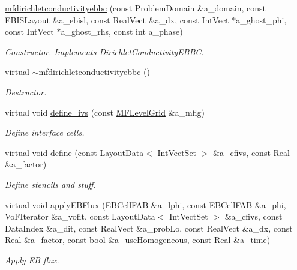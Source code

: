 \begin{DoxyCompactItemize}
\item 
\hyperlink{classmfdirichletconductivityebbc_a70c6f015454948e65e6f87c8acd89b8e}{mfdirichletconductivityebbc} (const Problem\+Domain \&a\+\_\+domain, const E\+B\+I\+S\+Layout \&a\+\_\+ebisl, const Real\+Vect \&a\+\_\+dx, const Int\+Vect $\ast$a\+\_\+ghost\+\_\+phi, const Int\+Vect $\ast$a\+\_\+ghost\+\_\+rhs, const int a\+\_\+phase)
\begin{DoxyCompactList}\small\item\em Constructor. Implements Dirichlet\+Conductivity\+E\+B\+BC. \end{DoxyCompactList}\item 
virtual \hyperlink{classmfdirichletconductivityebbc_af2c0eccded83a26d3831bf81c6e830c3}{$\sim$mfdirichletconductivityebbc} ()
\begin{DoxyCompactList}\small\item\em Destructor. \end{DoxyCompactList}\item 
virtual void \hyperlink{classmfdirichletconductivityebbc_ad5961934bb52b2bc57bf7b61f5c79a19}{define\+\_\+ivs} (const \hyperlink{classMFLevelGrid}{M\+F\+Level\+Grid} \&a\+\_\+mflg)
\begin{DoxyCompactList}\small\item\em Define interface cells. \end{DoxyCompactList}\item 
virtual void \hyperlink{classmfdirichletconductivityebbc_a22f4cc6776d899ccf249d073595f055e}{define} (const Layout\+Data$<$ Int\+Vect\+Set $>$ \&a\+\_\+cfivs, const Real \&a\+\_\+factor)
\begin{DoxyCompactList}\small\item\em Define stencils and stuff. \end{DoxyCompactList}\item 
virtual void \hyperlink{classmfdirichletconductivityebbc_afb73130d7f927a94291de2338c4a0282}{apply\+E\+B\+Flux} (E\+B\+Cell\+F\+AB \&a\+\_\+lphi, const E\+B\+Cell\+F\+AB \&a\+\_\+phi, Vo\+F\+Iterator \&a\+\_\+vofit, const Layout\+Data$<$ Int\+Vect\+Set $>$ \&a\+\_\+cfivs, const Data\+Index \&a\+\_\+dit, const Real\+Vect \&a\+\_\+prob\+Lo, const Real\+Vect \&a\+\_\+dx, const Real \&a\+\_\+factor, const bool \&a\+\_\+use\+Homogeneous, const Real \&a\+\_\+time)
\begin{DoxyCompactList}\small\item\em Apply EB flux. \end{DoxyCompactList}\item 

\end{DoxyCompactItemize}
